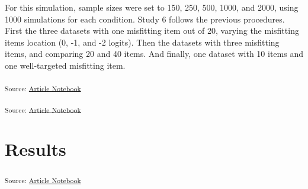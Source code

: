 \documentclass[
  letterpaper,
  DIV=11,
  numbers=noendperiod]{scrartcl}
\begin{document}
For this simulation, sample sizes were set to 150, 250, 500, 1000, and
2000, using 1000 simulations for each condition. Study 6 follows the
previous procedures. First the three datasets with one misfitting item
out of 20, varying the misfitting items location (0, -1, and -2 logits).
Then the datasets with three misfitting items, and comparing 20 and 40
items. And finally, one dataset with 10 items and one well-targeted
misfitting item.

\textsubscript{Source:
\href{https://pgmj.github.io/rasch_itemfit/index.qmd.html}{Article
Notebook}}

\textsubscript{Source:
\href{https://pgmj.github.io/rasch_itemfit/index.qmd.html}{Article
Notebook}}

\section{Results}\label{results-4}

\textsubscript{Source:
\href{https://pgmj.github.io/rasch_itemfit/index.qmd.html}{Article
Notebook}}
\end{document}

